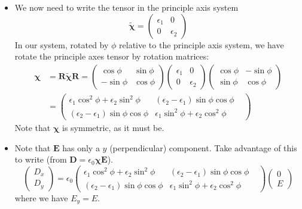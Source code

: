 \documentclass[11pt, a4paper]{article}
\renewcommand{\vec}[1]{\bm{#1}} %
\newcommand{\mat}[1]{\mathbf{#1}} %
\renewcommand{\t}[1]{\tilde{#1}} %
\newcommand{\E}{\vec{E}}  %
\newcommand{\D}{\vec{D}}  %
\newcommand{\e}{\epsilon}
\newcommand{\ee}{\epsilon_{0}}  %
\newcommand{\eee}{\bm{\chi}}  %
\begin{document}
\begin{itemize}
	\item We now need to write the tensor in the principle axis system
	\begin{equation*}
		\t{\eee} = 
		\begin{pmatrix}
			\e_{1} & 0\\
			0 & \e_{2}
		\end{pmatrix}
	\end{equation*}
	In our system, rotated by $ \phi $ relative to the principle axis system, we have rotate the principle axes tensor by rotation matrices:
	\begin{align*}
		\eee &= \mat{R} \t{\eee} \mat{R} = 
		\begin{pmatrix}
			\cos \phi & \sin \phi\\
			- \sin \phi & \cos \phi
		\end{pmatrix}
		\begin{pmatrix}
			\e_{1} & 0\\
			0 & \e_{2}
		\end{pmatrix}
		\begin{pmatrix}
			\cos \phi & - \sin \phi\\
			\sin \phi & \cos \phi
		\end{pmatrix}\\
		& = 
		\begin{pmatrix}
			\e_{1} \cos^{2}\phi + \e_{2} \sin^{2}\phi & (\e_{2} - \e_{1})\sin \phi \cos \phi \\
			(\e_{2} - \e_{1})\sin \phi \cos \phi & \e_{1} \sin^{2}\phi + \e_{2} \cos^{2}\phi &
		\end{pmatrix}
	\end{align*}
	Note that $ \eee $ is symmetric, as it must be. 
	
	\item Note that $ \E $ has only a $ y $ (perpendicular) component. Take advantage of this to write (from $ \D = \ee \eee \E $). 
	\begin{equation*}
		\begin{pmatrix}
			D_{x}\\
			D_{y}
		\end{pmatrix}
		 = 
		 \ee 
 		\begin{pmatrix}
 			\e_{1} \cos^{2}\phi + \e_{2} \sin^{2}\phi & (\e_{2} - \e_{1})\sin \phi \cos \phi \\
 			(\e_{2} - \e_{1})\sin \phi \cos \phi & \e_{1} \sin^{2}\phi + \e_{2} \cos^{2}\phi &
 		\end{pmatrix}
		\begin{pmatrix}
			0\\
			E
		\end{pmatrix}
	\end{equation*}
	where we have $ E_{y} = E $. 
	

\end{itemize}
\end{document}
